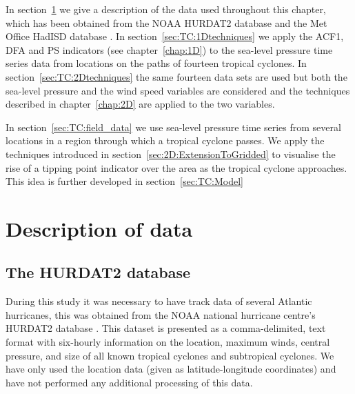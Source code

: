 {}

In section~\ref{sec:TC:data} we give a description of the data used throughout this chapter, which has been obtained from the NOAA HURDAT2 database  \citep{HURDAT2} and the Met Office HadISD database \citep{HadISD}. In section~\ref{sec:TC:1Dtechniques} we apply the ACF1, DFA and PS indicators (see chapter~\ref{chap:1D}) to the sea-level pressure time series data from locations on the paths of fourteen tropical cyclones. In section~\ref{sec:TC:2Dtechniques} the same fourteen {\Red data sets} are used but both the sea-level pressure and the wind speed variables are considered and the techniques described in chapter~\ref{chap:2D} are applied to the two variables.

In section~\ref{sec:TC:field_data} we use sea-level pressure time series from several locations in a region through which a tropical cyclone passes. We apply the techniques introduced in section~\ref{sec:2D:ExtensionToGridded} to visualise the rise of a tipping point indicator over the area as the tropical cyclone approaches. This idea is further developed in section~\ref{sec:TC:Model} {}

\section{Description of data}
\label{sec:TC:data}

\subsection{The HURDAT2 database}
\label{subsec:TC:data:HURDAT}

During this study it was necessary to have track data of several Atlantic hurricanes, this was obtained from the NOAA national hurricane centre's HURDAT2 database \citep{landsea2013, HURDAT2}. This dataset is presented as a comma-delimited, text format with six-hourly information on the location, maximum winds, central pressure, and size of all known tropical cyclones and subtropical cyclones. We have only used the location data (given as latitude-longitude coordinates) and have not performed any additional processing of this data.


